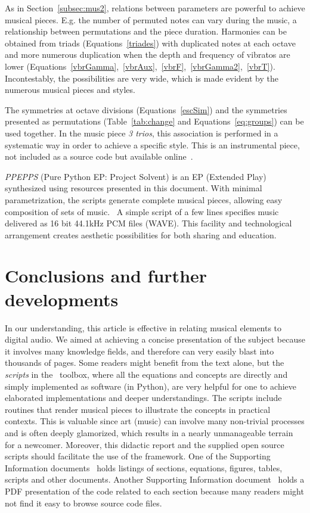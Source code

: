 As in Section~\ref{subsec:mus2}, relations between
parameters are powerful to achieve musical pieces.
E.g. the number of permuted
notes can vary during the music, a relationship between permutations and the piece
duration. Harmonies can be obtained from triads (Equations~\ref{triades}) with duplicated
notes at each octave and more numerous duplication when the depth and frequency of
vibratos are lower (Equations~\ref{vbrGamma},~\ref{vbrAux},~\ref{vbrF},~\ref{vbrGamma2},~\ref{vbrT}).
Incontestably, the possibilities are very wide, which is made evident by the numerous musical pieces and styles.

The symmetries at octave divisions (Equations~\ref{escSim}) and the
symmetries presented as permutations (Table~\ref{tab:change} and
Equations~\ref{eq:groups}) can be used together. In the music piece \emph{3 trios},
this association is performed in a systematic way in order to achieve a specific style.
This is an instrumental piece, not included as a source code but available online~\cite{3Trios}.

\emph{PPEPPS} (Pure Python EP: Project Solvent) is an EP (Extended Play) synthesized using
resources presented in this document. With minimal parametrization, the scripts
generate complete musical pieces, allowing easy composition of sets of
music.~\cite{figgus} A simple script of a few lines specifies music delivered as 16 bit
44.1kHz PCM files (WAVE). This facility and technological
arrangement creates aesthetic possibilities for both sharing and education.

\section{Conclusions and further developments}
\label{cap:conclusao}
In our understanding,
this article is effective in relating musical elements to digital audio.
We aimed at achieving a concise presentation of the subject because it involves many knowledge fields, and therefore can very easily blast into thousands of pages.
Some readers might benefit from the text alone, but the \emph{scripts} in the \massa\ toolbox, where all the equations and concepts are directly and simply implemented as software (in Python),
are very helpful for one to achieve elaborated implementations and deeper understandings.
The scripts include routines that render musical pieces to illustrate the concepts in practical contexts.
This is valuable since art (music) can involve many non-trivial processes and is often deeply glamorized, which results in a nearly unmanageable terrain for a newcomer.
Moreover, this didactic report and the supplied open source scripts should facilitate the use of the framework.
One of the Supporting Information documents~\cite{massListings} holds listings of sections, equations, figures, tables, scripts and other documents.
Another Supporting Information document~\cite{massCode} holds a PDF presentation of the code related to each section
because many readers might not find it easy to browse source code files.

